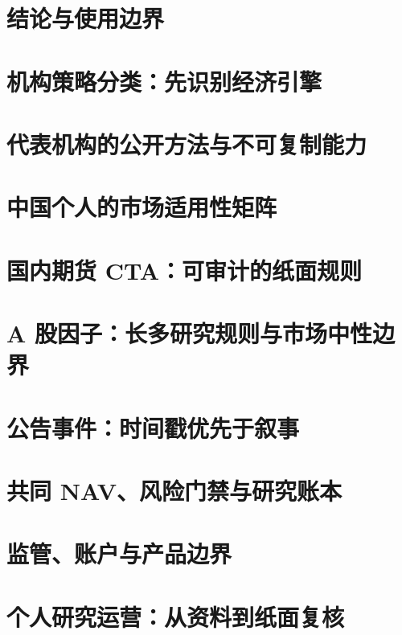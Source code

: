 \documentclass[a4paper,11pt,openany,fontset=none]{ctexrep}
\begin{document}
\astockcover

\tableofcontents
\clearpage

\chapter{结论与使用边界}


\chapter{机构策略分类：先识别经济引擎}


\chapter{代表机构的公开方法与不可复制能力}


\chapter{中国个人的市场适用性矩阵}


\chapter{国内期货 CTA：可审计的纸面规则}


\chapter{A 股因子：长多研究规则与市场中性边界}


\chapter{公告事件：时间戳优先于叙事}


\chapter{共同 NAV、风险门禁与研究账本}


\chapter{监管、账户与产品边界}


\chapter{个人研究运营：从资料到纸面复核}

\end{document}
